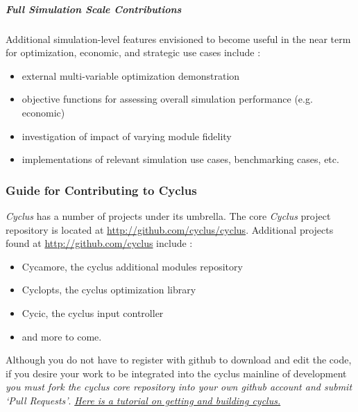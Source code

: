 \documentclass[letterpaper,10pt,english]{sphinxmanual}
\begin{document}
\subparagraph{Full Simulation Scale Contributions}
\label{basics/roadmap:full-simulation-scale-contributions}
Additional simulation-level features envisioned to become useful in the near
term for optimization, economic, and strategic use cases include :
\begin{itemize}
\item {} 
external multi-variable optimization demonstration

\item {} 
objective functions for assessing overall simulation performance (e.g. economic)

\item {} 
investigation of impact of varying module fidelity

\item {} 
implementations of relevant simulation use cases, benchmarking cases, etc.

\end{itemize}


\subsubsection{Guide for Contributing to Cyclus}
\label{devdoc/contributing_to_cyclus:guide-for-contributing-to-cyclus}\label{devdoc/contributing_to_cyclus::doc}
\emph{Cyclus} has a number of projects under its umbrella.
The core \emph{Cyclus} project repository is located at
\href{http://github.com/cyclus/cyclus}{http://github.com/cyclus/cyclus}. Additional projects found at
\href{http://github.com/cyclus}{http://github.com/cyclus} include :
\begin{itemize}
\item {} 
Cycamore, the cyclus additional modules repository

\item {} 
Cyclopts, the cyclus optimization library

\item {} 
Cycic, the cyclus input controller

\item {} 
and more to come.

\end{itemize}

Although you do not have to register with github to
download and edit the code, if you desire your work to be integrated into the
cyclus mainline of development \emph{you must fork the cyclus core repository into
your own github account and submit `Pull Requests'}. {\hyperref[devdoc/get_and_build::doc]{\emph{Here is a tutorial on
getting and building cyclus.}}}
\end{document}
